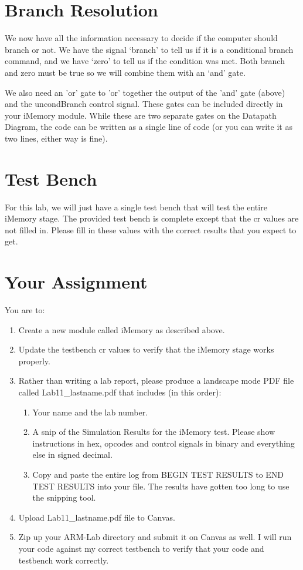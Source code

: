 \section{Branch Resolution}

We now have all the information necessary to decide if the computer should branch or not.  We have the signal `branch' to tell us if it is a conditional branch command, and we have `zero' to tell us if the condition was met.  Both branch and zero must be true so we will combine them with an `and' gate.

We also need an 'or' gate to 'or' together the output of the 'and' gate (above) and the uncondBranch control signal.  These gates can be included directly in your iMemory module. While these are two separate gates on the Datapath Diagram, the code can be written as a single line of code (or you can write it as two lines, either way is fine).

\section{Test Bench}
For this lab, we will just have a single test bench that will test the entire iMemory stage.  The provided test bench is complete except that the cr values are not filled in.  Please fill in these values with the correct results that you expect to get.

\section{Your Assignment}

You are to:
\begin{enumerate}
\item Create a new module called iMemory as described above.
\item Update the testbench cr values to verify that the iMemory stage works properly. 
\item Rather than writing a lab report, please produce a landscape mode PDF file called Lab11\_lastname.pdf that includes (in this order):
\begin{enumerate}
	\item Your name and the lab number.
	\item A snip of the Simulation Results for the iMemory test.  Please show instructions in hex, opcodes and control signals in binary and everything else in signed decimal.  
	\item Copy and paste the entire log from BEGIN TEST RESULTS to END TEST RESULTS into your file.  The results have gotten too long to use the snipping tool.	
\end{enumerate}
\item Upload Lab11\_lastname.pdf file to Canvas.
\item Zip up your ARM-Lab directory and submit it on Canvas as well.  I will run your code against my correct testbench to verify that your code and testbench work correctly.
\end{enumerate} 